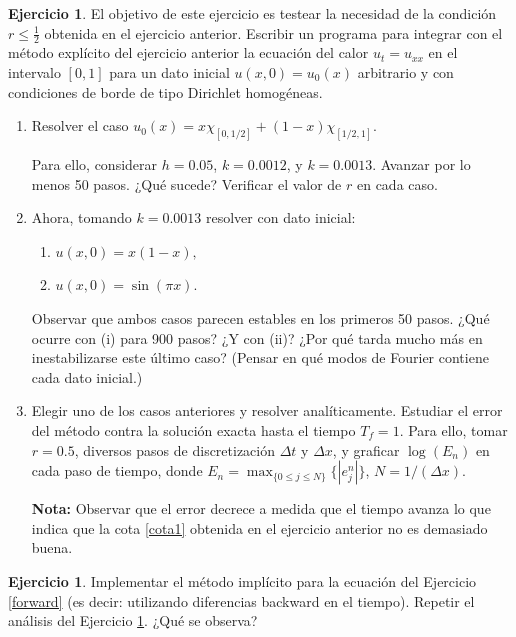 \documentclass[12pt, a4paper]{amsbook}
\theoremstyle{remark}
\theoremstyle{definition}
\newtheorem{ejer}[teo]{Ejercicio}
\numberwithin{section}{chapter}
\numberwithin{subsection}{section}
\numberwithin{equation}{section}
\numberwithin{figure}{chapter}
\begin{document}
\begin{ejer} \label{programita}
El objetivo de este ejercicio es testear la necesidad de la condición $r\le\frac{1}{2}$ obtenida en el ejercicio anterior. Escribir un programa para integrar con el método explícito del
ejercicio anterior la ecuación del calor $u_t=u_{xx}$ en el intervalo $[0,1]$ para un dato
inicial $u(x,0) = u_0(x)$ arbitrario y con condiciones de borde de tipo Dirichlet homogéneas.

\begin{enumerate}[label=(\alph*)]
 \item Resolver el caso $u_0(x) = x\chi_{[0,1/2]} + (1-x)\chi_{[1/2,1]}$.

 Para ello, considerar $h=0.05$,  $k=0.0012$, y $k=0.0013$. Avanzar por lo menos
50 pasos. ¿Qué sucede? Verificar el valor de $r$ en cada caso.

\item Ahora, tomando $k=0.0013$ resolver con dato inicial:
\begin{enumerate}[label=(\roman*)]
\item $u(x,0)= x(1-x), $
\item $u(x,0)= \sin (\pi x). $
\end{enumerate}

Observar que ambos casos parecen estables en los primeros 50
pasos. ¿Qué ocurre con (i) para 900 pasos? ¿Y con (ii)?
¿Por qué tarda mucho más en inestabilizarse este último caso? (Pensar en qué modos de Fourier contiene cada dato inicial.)

\item Elegir uno de los casos anteriores y resolver analíticamente.
Estudiar el error del método contra la solución exacta hasta el
tiempo $T_f=1$. Para ello, tomar $r=0.5$, diversos pasos de discretización
$\Delta  t$ y $\Delta  x$, y graficar $\log(E_n)$ en cada paso de tiempo, donde
$E_n= \max_{ \{ 0\leq j \leq N \} } \{|e^n_j|\}$, $N=1/(\Delta x)$.

\textbf{Nota:} Observar que el error decrece a medida que el tiempo avanza lo que indica que la
cota \eqref{cota1} obtenida en el ejercicio anterior no es demasiado buena.
\end{enumerate}
\end{ejer}

\begin{ejer} Implementar el método implícito para la ecuación del Ejercicio \ref{forward} (es decir: utilizando diferencias backward en el tiempo). Repetir el análisis del Ejercicio \ref{programita}. ¿Qué se observa? 
\end{ejer}
\end{document}
